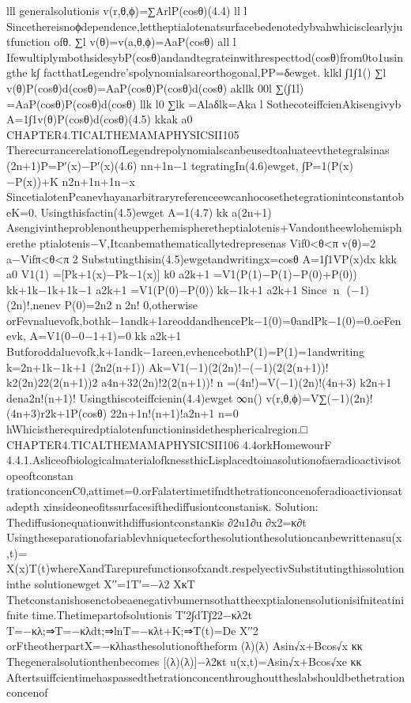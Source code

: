 {{{lll
generalsolutionis
v(r,θ,ϕ)=∑ArlP(cosθ)(4.4)
ll
l
Sincethereisnoϕdependence,lettheptialotenatsurfacebedenotedybvahwhicisclearlyjutfunction
ofθ.
∑l
v(θ)=v(a,θ,ϕ)=AaP(cosθ)
all
l
IfewultiplymbothsidesybP(cosθ)andandtegrateinwithrespecttod(cosθ)from0to1usingthe
k∫
factthatLegendre’spolynomialsareorthogonal,PP=δewget.
klkl
∫1∫1()
∑l
v(θ)P(cosθ)d(cosθ)=AaP(cosθ)P(cosθ)d(cosθ)
akllk
00l
∑(∫1l)
=AaP(cosθ)P(cosθ)d(cosθ)
llk
l0
∑lk
=Alaδlk=Aka
l
SothecoteiffcienAkisengivyb
A=1∫1v(θ)P(cosθ)d(cosθ)(4.5)
kkak
a0
CHAPTER4.TICALTHEMAMAPHYSICSII105
TherecurrancerelationofLegendrepolynomialscanbeusedtoaluateevthetegralsinas
(2n+1)P=P′(x)−P′(x)(4.6)
nn+1n−1
tegratingIn(4.6)ewget,
∫P=1(P(x)−P(x))+K
n2n+1n+1n−x
SincetialotenPcanevhayanarbitraryreferenceewcanhocosethetegrationintconstantobeK=0.
Usingthisfactin(4.5)ewget
A=1(4.7)
kk
a(2n+1)
Asengivintheproblenontheupperhemispheretheptialotenis+Vandontheewlohemispherethe
ptialotenis−V,Itcanbemathematicallytedrepresenas{
Vif0<θ<π
v(θ)=2
a−Vifπ<θ<π
2
Substutingthisin(4.5)ewgetandwritingx=cosθ
A=1∫1VP(x)dx
kkk
a0
V1(1)
=[Pk+1(x)−Pk−1(x)]
k0
a2k+1
=V1(P(1)−P(1)−P(0)+P(0))
kk+1k−1k+1k−1
a2k+1
=V1(P(0)−P(0))
kk−1k+1
a2k+1
Since
n
(−1)(2n)!,nenev
P(0)=2n2
n2n!
0,otherwise
orFevnaluevofk,bothk−1andk+1areoddandhencePk−1(0)=0andPk−1(0)=0.oeFenevk,
A=V1(0−0−1+1)=0
kk
a2k+1
Butforoddaluevofk,k+1andk−1areen,evhencebothP(1)=P(1)=1andwriting
k=2n+1k−1k+1
(2n2(n+1))
Ak=V1(−1)(2(2n)!−(−1)(2(2(n+1))!
k2(2n)22(2(n+1))2
a4n+32(2n)!2(2(n+1))!
n
=(4n!)=V(−1)(2n)!(4n+3)
k2n+1
dena2n!(n+1)!
Usingthiscoteiffcienin(4.4)ewget
∞n()
v(r,θ,ϕ)=V∑(−1)(2n)!(4n+3)r2k+1P(cosθ)
22n+1n!(n+1)!a2n+1
n=0
hWhicistherequiredptialotenfunctioninsidethesphericalregion.□
CHAPTER4.TICALTHEMAMAPHYSICSII106
4.4orkHomewourF
4.4.1.AsliceofbiologicalmaterialofknessthicLisplacedtoinasolutionofaeradioactivisotopeoftconstan
trationconcenC0,attimet=0.orFalatertimetifndthetrationconcenoferadioactivionsatadepth
xinsideoneofitssurfacesifthediffusiontconstanisκ.
Solution:
Thediffusionequationwithdiffusiontconstanκis
∂2u1∂u
∂x2=κ∂t
Usingtheseparationofariablevhniquetecforthesolutionthesolutioncanbewrittenasu(x,t)=
X(x)T(t)whereXandTarepurefunctionsofxandt.respelyectivSubstitutingthissolutioninthe
solutionewget
X′′=1T′=−λ2
XκT
Thetconstanishosenctobeaenegativbumernsothattheexptialonensolutionisifniteatinifnite
time.Thetimepartofsolutionis
T′2∫dT∫22−κλ2t
T=−κλ;⇒T=−κλdt;⇒lnT=−κλt+K;⇒T(t)=De
X′′2
orFtheotherpartX=−κλhasthesolutionoftheform
(λ)(λ)
Asin√x+Bcos√x
κκ
Thegeneralsolutionthenbecomes
[(λ)(λ)]−λ2κt
u(x,t)=Asin√x+Bcos√xe
κκ
Aftertsuiffcientimehaspassedthetrationconcenthroughouttheslabshouldbethetrationconcenof
}}}}
